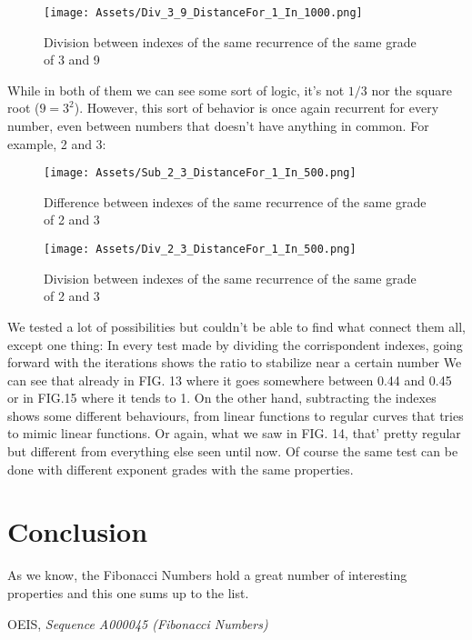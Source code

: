 \documentclass[amsmath,amssymb,aps,pra,reprint,groupedaddress,showpacs]{revtex4-1}
\begin{document}
\begin{figure}[H]
\centering
\texttt{[image: Assets/Div\_3\_9\_DistanceFor\_1\_In\_1000.png]}
\caption{Division between indexes of the same recurrence of the same grade of 3 and 9}
\end{figure}

While in both of them we can see some sort of logic, it's not $1/3$ nor the square root ($9 = 3^2$).
However, this sort of behavior is once again recurrent for every number, even between numbers that doesn't have anything in common.
For example, 2 and 3:

\begin{figure}[H]
\centering
\texttt{[image: Assets/Sub\_2\_3\_DistanceFor\_1\_In\_500.png]}
\caption{Difference between indexes of the same recurrence of the same grade of 2 and 3}
\end{figure}

\begin{figure}[H]
\centering
\texttt{[image: Assets/Div\_2\_3\_DistanceFor\_1\_In\_500.png]}
\caption{Division between indexes of the same recurrence of the same grade of 2 and 3}
\end{figure}

We tested a lot of possibilities but couldn't be able to find what connect them all, except one thing:
In every test made by dividing the corrispondent indexes, going forward with the iterations shows the ratio to stabilize near a certain number
We can see that already in FIG. 13 where it goes somewhere between 0.44 and 0.45 or in FIG.15 where it tends to 1.
On the other hand, subtracting the indexes shows some different behaviours, from linear functions to regular curves that tries to mimic linear functions.
Or again, what we saw in FIG. 14, that' pretty regular but different from everything else seen until now.
Of course the same test can be done with different exponent grades with the same properties.

\section{Conclusion}

As we know, the Fibonacci Numbers hold a great number of interesting properties and this one sums up to the list.

\begin{thebibliography}{24}
 
{OEIS},
\textit{Sequence A000045 (Fibonacci Numbers)}

\end{thebibliography}
\end{document}
